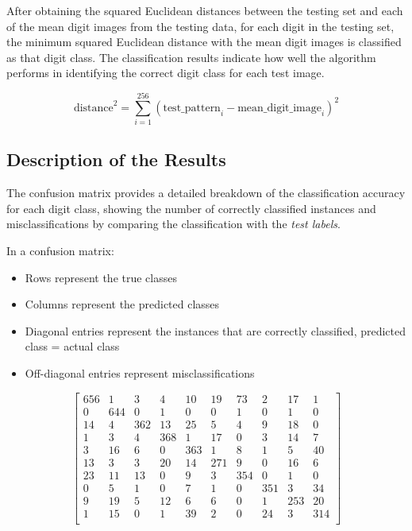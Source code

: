 \documentclass{article}
\begin{document}
After obtaining the squared Euclidean distances between the testing set and each of the mean digit images from the testing data, for each digit in the testing set, the minimum squared Euclidean distance with the mean digit images is classified as that digit class. The classification results indicate how well the algorithm performs in identifying the correct digit class for each test image. 

\[
\text{distance}^2 = \sum_{i=1}^{256} (\text{test\_pattern}_i - \text{mean\_digit\_image}_i)^2
\]

\subsection{Description of the Results}

The confusion matrix provides a detailed breakdown of the classification accuracy for each digit class, showing the number of correctly classified instances and misclassifications by comparing the classification with the \textit{test labels}.

In a confusion matrix:
\begin{itemize}
\item Rows represent the true classes
\item Columns represent the predicted classes
\item Diagonal entries represent the instances that are correctly classified, predicted class = actual class
\item Off-diagonal entries represent misclassifications
\end{itemize}

\[
\begin{bmatrix}
656 & 1 & 3 & 4 & 10 & 19 & 73 & 2 & 17 & 1 \\
0 & 644 & 0 & 1 & 0 & 0 & 1 & 0 & 1 & 0 \\
14 & 4 & 362 & 13 & 25 & 5 & 4 & 9 & 18 & 0 \\
1 & 3 & 4 & 368 & 1 & 17 & 0 & 3 & 14 & 7 \\
3 & 16 & 6 & 0 & 363 & 1 & 8 & 1 & 5 & 40 \\
13 & 3 & 3 & 20 & 14 & 271 & 9 & 0 & 16 & 6 \\
23 & 11 & 13 & 0 & 9 & 3 & 354 & 0 & 1 & 0 \\
0 & 5 & 1 & 0 & 7 & 1 & 0 & 351 & 3 & 34 \\
9 & 19 & 5 & 12 & 6 & 6 & 0 & 1 & 253 & 20 \\
1 & 15 & 0 & 1 & 39 & 2 & 0 & 24 & 3 & 314 \\
\end{bmatrix}
\]
\end{document}
